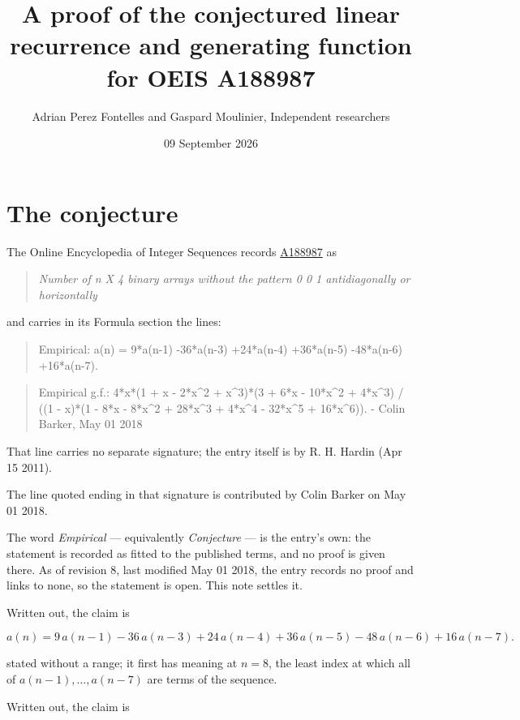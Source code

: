 \documentclass[11pt]{article}
\title{A proof of the conjectured linear recurrence and generating function for OEIS A188987}
\author{Adrian Perez Fontelles and Gaspard Moulinier, Independent researchers}
\date{09 September 2026}
\theoremstyle{definition}
\begin{document}
\maketitle
\section{The conjecture}

The Online Encyclopedia of Integer Sequences records \href{https://oeis.org/A188987}{A188987} as

\begin{quote}\itshape Number of n X 4 binary arrays without the pattern 0 0 1 antidiagonally or horizontally\end{quote}

and carries in its Formula section the lines:

\begin{quote}\ttfamily Empirical: a(n) = 9*a(n-1) -36*a(n-3) +24*a(n-4) +36*a(n-5) -48*a(n-6) +16*a(n-7).\end{quote}

\begin{quote}\ttfamily Empirical g.f.: 4*x*(1 + x - 2*x\textasciicircum{}2 + x\textasciicircum{}3)*(3 + 6*x - 10*x\textasciicircum{}2 + 4*x\textasciicircum{}3) / ((1 - x)*(1 - 8*x - 8*x\textasciicircum{}2 + 28*x\textasciicircum{}3 + 4*x\textasciicircum{}4 - 32*x\textasciicircum{}5 + 16*x\textasciicircum{}6)). - Colin Barker, May 01 2018\end{quote}

That line carries no separate signature; the entry itself is by R. H. Hardin (Apr 15 2011).

The line quoted ending in that signature is contributed by Colin Barker on May 01 2018.

The word {\itshape Empirical} --- equivalently {\itshape Conjecture} --- is the entry's own: the statement is recorded as fitted to the published terms, and no proof is given there. As of revision 8, last modified May 01 2018, the entry records no proof and links to none, so the statement is open. This note settles it.

Written out, the claim is

\[a(n) = 9\,a(n-1) - 36\,a(n-3) + 24\,a(n-4) + 36\,a(n-5) - 48\,a(n-6) + 16\,a(n-7).\]

stated without a range; it first has meaning at $n = 8$, the least index at which all of $a(n-1),\dots,a(n-7)$ are terms of the sequence.

Written out, the claim is
\end{document}
